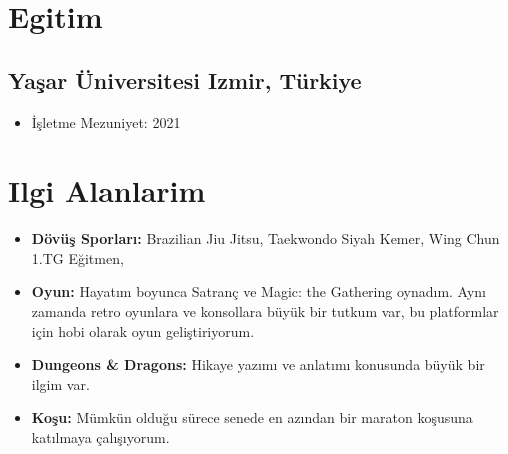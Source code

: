 \documentclass[11pt]{article}
\newcommand{\rside}[1]{
  \hfill {\normalfont\color{accent} #1}%
}
\begin{document}
\section{Egitim}
\subsection{Yaşar Üniversitesi \rside{Izmir, Türkiye}}
\begin{itemize}
    \item{İşletme \rside{Mezuniyet: 2021}}
\end{itemize}
\section{Ilgi Alanlarim}
\begin{itemize}
    \item \textbf{Dövüş Sporları:} Brazilian Jiu Jitsu, Taekwondo Siyah Kemer, Wing Chun 1.TG Eğitmen, 
    \item \textbf{Oyun:} Hayatım boyunca Satranç ve Magic: the Gathering oynadım. Aynı zamanda retro oyunlara ve konsollara büyük bir tutkum var, bu platformlar için hobi olarak oyun geliştiriyorum. 
    \item \textbf{Dungeons \& Dragons:} Hikaye yazımı ve anlatımı konusunda büyük bir ilgim var.
    \item \textbf{Koşu:} Mümkün olduğu sürece senede en azından bir maraton koşusuna katılmaya çalışıyorum.
\end{itemize}
\end{document}
